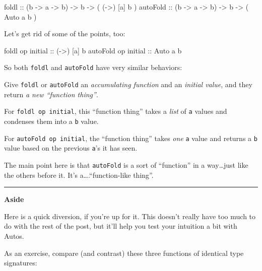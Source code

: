 \documentclass[]{article}
\newenvironment{Shaded}{\begin{snugshade}}{\end{snugshade}}
\newcommand{\DataTypeTok}[1]{\textcolor[rgb]{0.13,0.29,0.53}{#1}}
\newcommand{\NormalTok}[1]{#1}
\newcommand{\OtherTok}[1]{\textcolor[rgb]{0.56,0.35,0.01}{#1}}
\begin{document}
\begin{Shaded}
\begin{Highlighting}[]
\NormalTok{foldl}\OtherTok{      ::}\NormalTok{ (b }\OtherTok{->}\NormalTok{ a }\OtherTok{->}\NormalTok{ b) }\OtherTok{->}\NormalTok{ b }\OtherTok{->}\NormalTok{ ( (}\OtherTok{->}\NormalTok{) [a] b )}
\OtherTok{autoFold   ::}\NormalTok{ (b }\OtherTok{->}\NormalTok{ a }\OtherTok{->}\NormalTok{ b) }\OtherTok{->}\NormalTok{ b }\OtherTok{->}\NormalTok{ ( }\DataTypeTok{Auto}\NormalTok{  a  b )}
\end{Highlighting}
\end{Shaded}

Let's get rid of some of the points, too:

\begin{Shaded}
\begin{Highlighting}[]
\NormalTok{foldl    op}\OtherTok{ initial  ::}\NormalTok{ (}\OtherTok{->}\NormalTok{) [a] b}
\NormalTok{autoFold op}\OtherTok{ initial  ::} \DataTypeTok{Auto}\NormalTok{  a  b}
\end{Highlighting}
\end{Shaded}

So both \texttt{foldl} and \texttt{autoFold} have very similar behaviors:

Give \texttt{foldl} or \texttt{autoFold} an \emph{accumulating function} and an
\emph{initial value}, and they return \emph{a new ``function thing''}.

For \texttt{foldl\ op\ initial}, this ``function thing'' takes a \emph{list} of
\texttt{a} values and condenses them into a \texttt{b} value.

For \texttt{autoFold\ op\ initial}, the ``function thing'' takes \emph{one}
\texttt{a} value and returns a \texttt{b} value based on the previous
\texttt{a}'s it has seen.

The main point here is that \texttt{autoFold} is a sort of ``function'' in a
way\ldots{}just like the others before it. It's a\ldots{}.``function-like
thing''.

\begin{center}\rule{0.5\linewidth}{\linethickness}\end{center}

\textbf{Aside}

Here is a quick diversion, if you're up for it. This doesn't really have too
much to do with the rest of the post, but it'll help you test your intuition a
bit with Autos.

As an exercise, compare (and contrast) these three functions of identical type
signatures:
\end{document}
